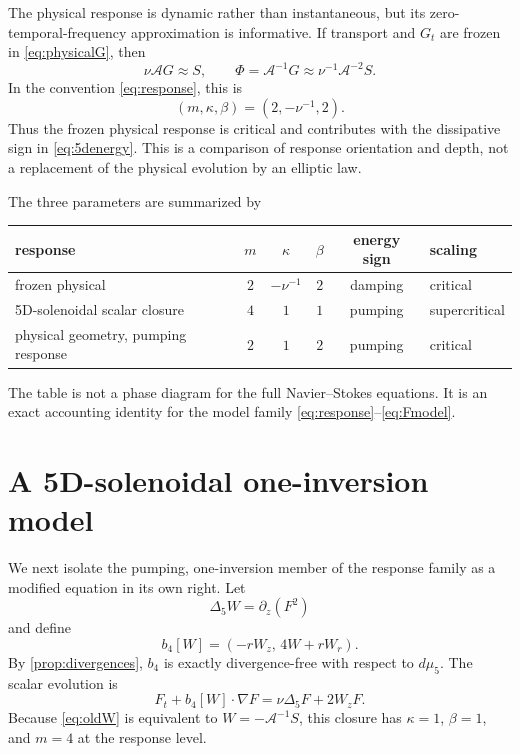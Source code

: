 \documentclass[11pt]{article}
\theoremstyle{definition}
\newcommand{\A}{\mathcal A}
\begin{document}
The physical response is dynamic rather than instantaneous, but its zero-temporal-frequency approximation is informative.  If transport and $G_t$ are frozen in \eqref{eq:physicalG}, then
\[
 \nu\A G\approx S,
 \qquad
 \Phi=\A^{-1}G\approx\nu^{-1}\A^{-2}S.
\]
In the convention \eqref{eq:response}, this is
\begin{equation}\label{eq:frozenphysical}
 (m,\kappa,\beta)=(2,-\nu^{-1},2).
\end{equation}
Thus the frozen physical response is critical and contributes with the dissipative sign in \eqref{eq:5denergy}.  This is a comparison of response orientation and depth, not a replacement of the physical evolution by an elliptic law.

The three parameters are summarized by
\begin{center}
\begin{tabular}{lccccl}
\toprule
response & $m$ & $\kappa$ & $\beta$ & energy sign & scaling \\
\midrule
frozen physical & $2$ & $-\nu^{-1}$ & $2$ & damping & critical \\
5D-solenoidal scalar closure & $4$ & $1$ & $1$ & pumping & supercritical \\
physical geometry, pumping response & $2$ & $1$ & $2$ & pumping & critical \\
\bottomrule
\end{tabular}
\end{center}
The table is not a phase diagram for the full Navier--Stokes equations.  It is an exact accounting identity for the model family \eqref{eq:response}--\eqref{eq:Fmodel}.

\section{A 5D-solenoidal one-inversion model}

We next isolate the pumping, one-inversion member of the response family as a modified equation in its own right.  Let
\begin{equation}\label{eq:oldW}
 \Delta_5W=\partial_z(F^2)
\end{equation}
and define
\begin{equation}\label{eq:b4}
 b_4[W]=(-rW_z,\,4W+rW_r).
\end{equation}
By \cref{prop:divergences}, $b_4$ is exactly divergence-free with respect to $d\mu_5$.  The scalar evolution is
\begin{equation}\label{eq:oldmodel}
 F_t+b_4[W]\cdot\nabla F
 =\nu\Delta_5F+2W_zF.
\end{equation}
Because \eqref{eq:oldW} is equivalent to $W=-\A^{-1}S$, this closure has $\kappa=1$, $\beta=1$, and $m=4$ at the response level.
\end{document}
